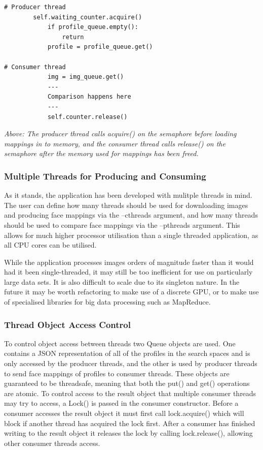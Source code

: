 \documentclass{article}
\begin{document}
\begin{lstlisting}
# Producer thread
		self.waiting_counter.acquire()
            if profile_queue.empty():
                return
            profile = profile_queue.get()
            
# Consumer thread
            img = img_queue.get()
            ---
            Comparison happens here
            ---
			self.counter.release()
\end{lstlisting}
\textit{Above: The producer thread calls acquire() on the semaphore before loading mappings in to memory, and the consumer thread calls release() on the semaphore after the memory used for mappings has been freed.}

\subsubsection{Multiple Threads for Producing and Consuming}
As it stands, the application has been developed with mulitple threads in mind. The user can define how many threads should be used for downloading images and producing face mappings via the --cthreads argument, and how many threads should be used to compare face mappings via the --pthreads argument. This allows for much higher processor utilisation than a single threaded application, as all CPU cores can be utilised.

While the application processes images orders of magnitude faster than it would had it been single-threaded, it may still be too inefficient for use on particularly large data sets. It is also difficult to scale due to its singleton nature. In the future it may be worth refactoring to make use of a discrete GPU, or to make use of specialised libraries for big data processing such as MapReduce.

\subsubsection{Thread Object Access Control}
To control object access between threads two Queue objects are used. One contains a JSON representation of all of the profiles in the search spaces and is only accessed by the producer threads, and the other is used by producer threads to send face mappings of profiles to consumer threads. These objects are guaranteed to be threadsafe, meaning that both the put() and get() operations are atomic. To control access to the result object that multiple consumer threads may try to access, a Lock() is passed in the consumer constructor. Before a consumer accesses the result object it must first call lock.acquire() which will block if another thread has acquired the lock first. After a consumer has finished writing to the result object it releases the lock by calling lock.release(), allowing other consumer threads access.
\end{document}
